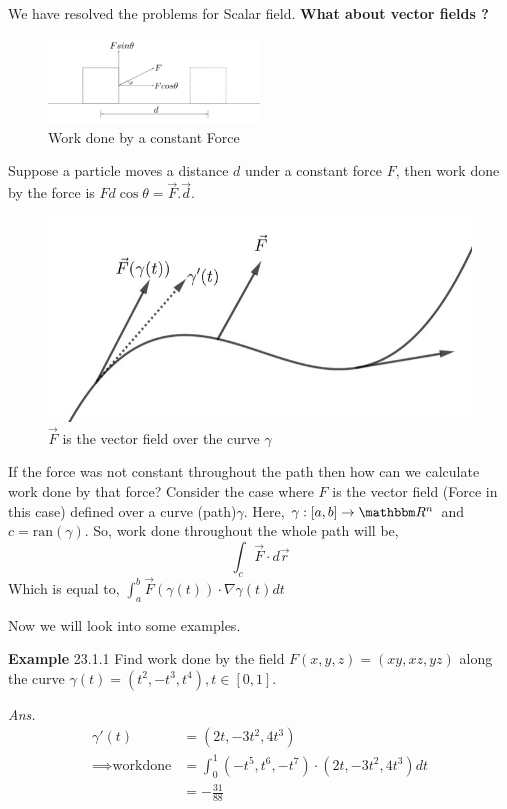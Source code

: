 \documentclass[Analysis-3]{subfiles}
\begin{document}
We have resolved the problems for Scalar field.\textbf{ What about vector fields ?}
\begin{figure}[H]
    \centering
    \includegraphics[width=0.5\textwidth]{figures/lec-23.2.png}
    \caption{Work done by a constant Force}
\end{figure}
Suppose a particle moves a distance $d$ under a constant force $F$, then work done by the force is $Fd\cos \theta = \vec{F}.\vec{d}$.


\begin{figure}
    \centering
    \includegraphics[width=.98\linewidth]{figures/lec-23.3.png}
    \caption{$\vec{F}$ is the vector field over the curve $\gamma$}
\end{figure}

If the force was not constant throughout the path then how can we calculate work done by that force?
Consider the case where $F$ is the vector field (Force in this case) defined over a curve (path)$\gamma$. Here, $\gamma : [a,b] \to \R^n$ and $c = \text{ran}(\gamma)$. So, work done throughout the whole path will be,
\[\int_c \vec{F}\cdot d\vec{r}\]
Which is equal to, $\int_a^b \vec{F}(\gamma(t))\cdot \nabla \gamma(t) dt$

Now we will look into some examples.
\vspace{0.3cm}

\textbf{Example} 23.1.1  Find work done by the field $F(x,y,z) = (xy,xz,yz)$ along the curve $\gamma(t) = (t^2,-t^3,t^4),t \in [0,1]$.

\textit{Ans.} \begin{align*}
    \gamma'(t)               & = (2t,-3t^2,4t^3)                                 \\
    \implies \text{workdone} & = \int_0^1 (-t^5,t^6,-t^7)\cdot(2t,-3t^2,4t^3) dt \\
                             & = -\frac{31}{88}
\end{align*}
\end{document}
